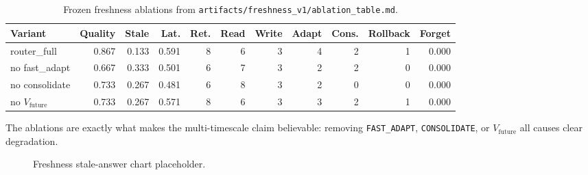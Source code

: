 \begin{table}[t]
\centering
\small
\begin{tabular}{lrrrrrrrrrr}
\toprule
Variant & Quality & Stale & Lat. & Ret. & Read & Write & Adapt & Cons. & Rollback & Forget \\
\midrule
router\_full & 0.867 & 0.133 & 0.591 & 8 & 6 & 3 & 4 & 2 & 1 & 0.000 \\
no fast\_adapt & 0.667 & 0.333 & 0.501 & 6 & 7 & 3 & 2 & 2 & 0 & 0.000 \\
no consolidate & 0.733 & 0.267 & 0.481 & 6 & 8 & 3 & 2 & 0 & 0 & 0.000 \\
no $V_{\text{future}}$ & 0.733 & 0.267 & 0.571 & 8 & 6 & 3 & 3 & 2 & 1 & 0.000 \\
\bottomrule
\end{tabular}
\caption{Frozen freshness ablations from \texttt{artifacts/freshness\_v1/ablation\_table.md}.}
\end{table}

The ablations are exactly what makes the multi-timescale claim believable: removing \texttt{FAST\_ADAPT}, \texttt{CONSOLIDATE}, or $V_{\text{future}}$ all causes clear degradation.

\begin{figure}[t]
\centering
{}
\caption{Freshness stale-answer chart placeholder.}
\end{figure}

